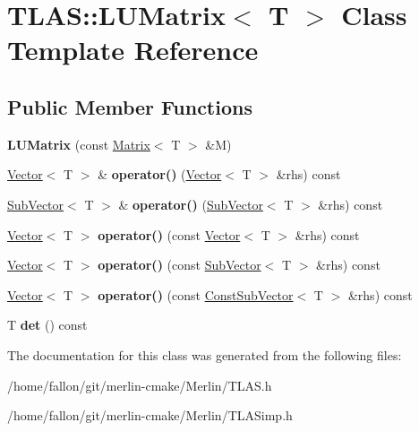 \hypertarget{classTLAS_1_1LUMatrix}{}\section{T\+L\+AS\+:\+:L\+U\+Matrix$<$ T $>$ Class Template Reference}
\label{classTLAS_1_1LUMatrix}
\subsection*{Public Member Functions}
\begin{DoxyCompactItemize}
\item 
\mbox{\label{classTLAS_1_1LUMatrix_a12adb425f742cb4300005fe732724f96}} 
{\bfseries L\+U\+Matrix} (const \hyperlink{classTLAS_1_1Matrix}{Matrix}$<$ T $>$ \&M)
\item 
\mbox{\label{classTLAS_1_1LUMatrix_a0f35b4996cab4ed281b24757e64aca8c}} 
\hyperlink{classTLAS_1_1Vector}{Vector}$<$ T $>$ \& {\bfseries operator()} (\hyperlink{classTLAS_1_1Vector}{Vector}$<$ T $>$ \&rhs) const
\item 
\mbox{\label{classTLAS_1_1LUMatrix_ab7ef672105533c8c7c1e76d820e940ba}} 
\hyperlink{classTLAS_1_1SubVector}{Sub\+Vector}$<$ T $>$ \& {\bfseries operator()} (\hyperlink{classTLAS_1_1SubVector}{Sub\+Vector}$<$ T $>$ \&rhs) const
\item 
\mbox{\label{classTLAS_1_1LUMatrix_a24a33167d4d0b9471d47d10521eee4fb}} 
\hyperlink{classTLAS_1_1Vector}{Vector}$<$ T $>$ {\bfseries operator()} (const \hyperlink{classTLAS_1_1Vector}{Vector}$<$ T $>$ \&rhs) const
\item 
\mbox{\label{classTLAS_1_1LUMatrix_a9ce97023c155ed718875397f56c27178}} 
\hyperlink{classTLAS_1_1Vector}{Vector}$<$ T $>$ {\bfseries operator()} (const \hyperlink{classTLAS_1_1SubVector}{Sub\+Vector}$<$ T $>$ \&rhs) const
\item 
\mbox{\label{classTLAS_1_1LUMatrix_a16feb95ac619cd1b0d80e4f8a90bf8b0}} 
\hyperlink{classTLAS_1_1Vector}{Vector}$<$ T $>$ {\bfseries operator()} (const \hyperlink{classTLAS_1_1ConstSubVector}{Const\+Sub\+Vector}$<$ T $>$ \&rhs) const
\item 
\mbox{\label{classTLAS_1_1LUMatrix_ad41b1d393b235d086698927901988653}} 
T {\bfseries det} () const
\end{DoxyCompactItemize}


The documentation for this class was generated from the following files\+:\begin{DoxyCompactItemize}
\item 
/home/fallon/git/merlin-\/cmake/\+Merlin/T\+L\+A\+S.\+h\item 
/home/fallon/git/merlin-\/cmake/\+Merlin/T\+L\+A\+Simp.\+h\end{DoxyCompactItemize}
